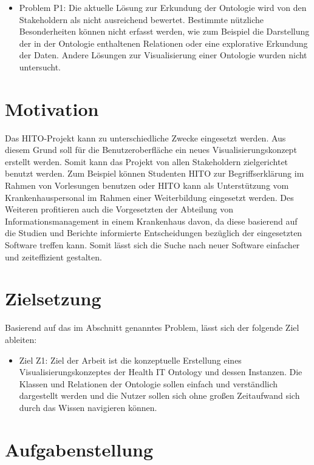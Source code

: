\begin{itemize}
\item Problem P1: Die aktuelle Lösung zur Erkundung der Ontologie wird von den Stakeholdern als nicht ausreichend bewertet.
Bestimmte nützliche Besonderheiten können nicht erfasst werden, wie zum Beispiel die Darstellung der in der Ontologie enthaltenen Relationen oder eine explorative Erkundung der Daten. 
Andere Lösungen zur Visualisierung einer Ontologie wurden nicht untersucht.
\end{itemize}

\section{Motivation}\label{sec:motivation}

Das HITO-Projekt kann zu unterschiedliche Zwecke eingesetzt werden. Aus diesem Grund soll für die Benutzeroberfläche ein neues Visualisierungskonzept erstellt werden. Somit kann das Projekt von allen Stakeholdern zielgerichtet benutzt werden. Zum Beispiel können Studenten HITO zur Begriffserklärung im Rahmen von Vorlesungen benutzen oder HITO kann als Unterstützung vom Krankenhauspersonal im Rahmen einer Weiterbildung eingesetzt werden. Des Weiteren profitieren auch die Vorgesetzten der Abteilung von Informationsmanagement in einem Krankenhaus davon, da diese basierend auf die Studien und Berichte informierte Entscheidungen bezüglich der eingesetzten Software treffen kann. Somit lässt sich die Suche nach neuer Software einfacher und zeiteffizient gestalten.

\section{Zielsetzung}\label{sec:zielsetzung}

Basierend auf das im Abschnitt  genanntes Problem, lässt sich der folgende Ziel ableiten:

\begin{itemize}
\item Ziel Z1: Ziel der Arbeit ist die konzeptuelle Erstellung eines Visualisierungskonzeptes der Health IT Ontology und dessen Instanzen.
Die Klassen und Relationen der Ontologie sollen einfach und verständlich dargestellt werden und die Nutzer sollen sich ohne großen Zeitaufwand sich durch das Wissen navigieren können.
\end{itemize}

\section{Aufgabenstellung}\label{sec:aufgabenstellung}


